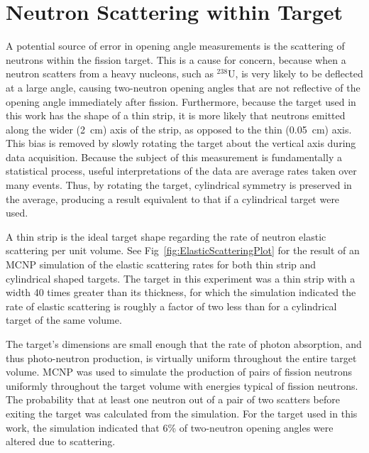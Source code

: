 \section{Neutron Scattering within Target}
\label{subsection:Elastic_scattering}
A potential source of error in opening angle measurements is the scattering of neutrons within the fission target.
This is a cause for concern, because when a neutron scatters from a heavy nucleons, such as $^{238}$U, is very likely to be deflected at a large angle, causing two-neutron opening angles that are not reflective of the opening angle immediately after fission.
Furthermore, because the target used in this work has the shape of a thin strip, it is more likely that neutrons emitted along the wider (2~cm) axis of the strip, as opposed to the thin (0.05~cm) axis.
This bias is removed by slowly rotating the target about the vertical axis during data acquisition.
Because the subject of this measurement is fundamentally a statistical process, useful interpretations of the data are average rates taken over many events.
Thus, by rotating the target, cylindrical symmetry is preserved in the average, producing a result equivalent to that if a cylindrical target were used.

A thin strip is the ideal target shape regarding the rate of neutron elastic scattering per unit volume.
See Fig~\ref{fig:ElasticScatteringPlot} for the result of an MCNP simulation of the elastic scattering rates for both thin strip and cylindrical shaped targets.
The target in this experiment was a thin strip with a width 40 times greater than its thickness, for which the simulation indicated the rate of elastic scattering is roughly a factor of two less than for a cylindrical target of the same volume.

The target's dimensions are small enough that the rate of photon absorption, and thus photo-neutron production, is virtually uniform throughout the entire target volume.
MCNP was used to simulate the production of pairs of fission neutrons uniformly throughout the target volume with energies typical of fission neutrons.
The probability that at least one neutron out of a pair of two scatters before exiting the target was calculated from the simulation.
For the target used in this work, the simulation indicated that 6\% of two-neutron opening angles were altered due to scattering.

